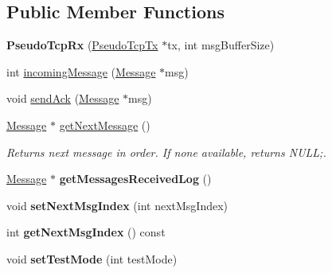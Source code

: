 \subsection*{Public Member Functions}
\begin{DoxyCompactItemize}
\item 
\hypertarget{classPseudoTcp_1_1PseudoTcpRx_affb9c0ab2a36efac35367d2e3c79a489}{
{\bfseries PseudoTcpRx} (\hyperlink{classPseudoTcp_1_1PseudoTcpTx}{PseudoTcpTx} $\ast$tx, int msgBufferSize)}
\label{classPseudoTcp_1_1PseudoTcpRx_affb9c0ab2a36efac35367d2e3c79a489}

\item 
int \hyperlink{classPseudoTcp_1_1PseudoTcpRx_aa55a67cd15ae280201e8d0f0e669c7d1}{incomingMessage} (\hyperlink{classPseudoTcp_1_1Message}{Message} $\ast$msg)
\item 
void \hyperlink{classPseudoTcp_1_1PseudoTcpRx_a1aa8f7e24cb9f2874f1a64a09ee05a50}{sendAck} (\hyperlink{classPseudoTcp_1_1Message}{Message} $\ast$msg)
\item 
\hypertarget{classPseudoTcp_1_1PseudoTcpRx_a78415c5ad421240b7c703457895b6fdc}{
\hyperlink{classPseudoTcp_1_1Message}{Message} $\ast$ \hyperlink{classPseudoTcp_1_1PseudoTcpRx_a78415c5ad421240b7c703457895b6fdc}{getNextMessage} ()}
\label{classPseudoTcp_1_1PseudoTcpRx_a78415c5ad421240b7c703457895b6fdc}

\begin{DoxyCompactList}\small\item\em Returns next message in order. If none available, returns NULL;. \item\end{DoxyCompactList}\item 
\hypertarget{classPseudoTcp_1_1PseudoTcpRx_ab9917709e5c28986442be9723845ff41}{
\hyperlink{classPseudoTcp_1_1Message}{Message} $\ast$ {\bfseries getMessagesReceivedLog} ()}
\label{classPseudoTcp_1_1PseudoTcpRx_ab9917709e5c28986442be9723845ff41}

\item 
\hypertarget{classPseudoTcp_1_1PseudoTcpRx_a02a4c0427ffadb328662e04fdde80518}{
void {\bfseries setNextMsgIndex} (int nextMsgIndex)}
\label{classPseudoTcp_1_1PseudoTcpRx_a02a4c0427ffadb328662e04fdde80518}

\item 
\hypertarget{classPseudoTcp_1_1PseudoTcpRx_af42d85cc23fe516691cb38935b99945e}{
int {\bfseries getNextMsgIndex} () const }
\label{classPseudoTcp_1_1PseudoTcpRx_af42d85cc23fe516691cb38935b99945e}

\item 
\hypertarget{classPseudoTcp_1_1PseudoTcpRx_a9e1169de580b94339ad3bbcb7bd3559b}{
void {\bfseries setTestMode} (int testMode)}
\label{classPseudoTcp_1_1PseudoTcpRx_a9e1169de580b94339ad3bbcb7bd3559b}


\end{DoxyCompactItemize}
